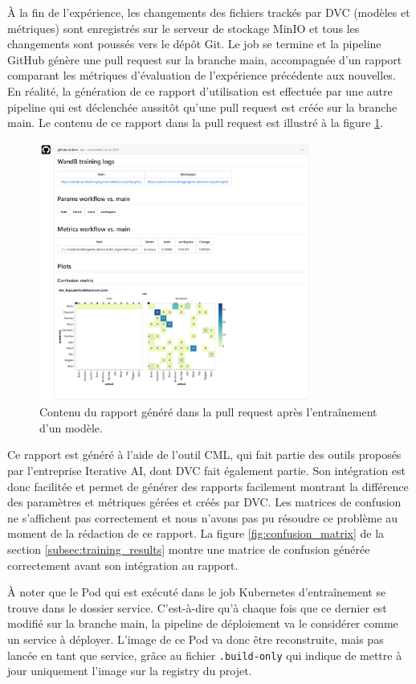 À la fin de l'expérience, les changements des fichiers trackés par DVC (modèles et métriques) sont enregistrés sur le serveur de stockage MinIO et tous les changements sont poussés vers le dépôt Git. Le job se termine et la pipeline GitHub génère une pull request sur la branche main, accompagnée d'un rapport comparant les métriques d'évaluation de l'expérience précédente aux nouvelles. En réalité, la génération de ce rapport d'utilisation est effectuée par une autre pipeline qui est déclenchée aussitôt qu'une pull request est créée sur la branche main. Le contenu de ce rapport dans la pull request est illustré à la figure \ref{fig:pull_request}.

\begin{figure}[H]
   \centering
   \includegraphics[width=0.8\textwidth]{rsc/report_pr.pdf}
   \caption{Contenu du rapport généré dans la pull request après l'entraînement d'un modèle.}
   \label{fig:pull_request}
\end{figure}

Ce rapport est généré à l'aide de l'outil CML, qui fait partie des outils proposés par l'entreprise Iterative AI, dont DVC fait également partie. Son intégration est donc facilitée et permet de générer des rapports facilement montrant la différence des paramètres et métriques gérées et créés par DVC. Les matrices de confusion ne s'affichent pas correctement et nous n'avons pas pu résoudre ce problème au moment de la rédaction de ce rapport. La figure \ref{fig:confusion_matrix} de la section \ref{subsec:training_results} montre une matrice de confusion générée correctement avant son intégration au rapport.

À noter que le Pod qui est exécuté dans le job Kubernetes d'entraînement se trouve dans le dossier service. C'est-à-dire qu'à chaque fois que ce dernier est modifié sur la branche main, la pipeline de déploiement va le considérer comme un service à déployer. L'image de ce Pod va donc être reconstruite, mais pas lancée en tant que service, grâce au fichier \verb|.build-only| qui indique de mettre à jour uniquement l'image sur la registry du projet.

